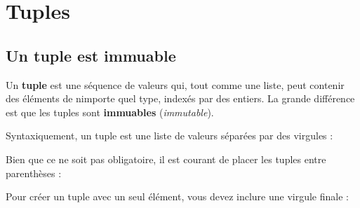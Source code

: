 \hypertarget{tuples}{%
\section{Tuples}\label{tuples}}

\hypertarget{un-tuple-est-immuable}{%
\subsection{Un tuple est immuable}\label{un-tuple-est-immuable}}

Un \textbf{tuple} est une séquence de valeurs qui, tout comme une liste,
peut contenir des éléments de n\textquotesingle importe quel type,
indexés par des entiers. La grande différence est que les tuples sont
\textbf{immuables} (\emph{immutable}).

Syntaxiquement, un tuple est une liste de valeurs séparées par des
virgules :

\begin{Shaded}
\begin{Highlighting}[]
\OperatorTok{\textgreater{}\textgreater{}\textgreater{}}\OperatorTok{=} \NormalTok{, }\NormalTok{, }\NormalTok{, }\NormalTok{, }
\end{Highlighting}
\end{Shaded}

Bien que ce ne soit pas obligatoire, il est courant de placer les tuples
entre parenthèses :

\begin{Shaded}
\begin{Highlighting}[]
\OperatorTok{\textgreater{}\textgreater{}\textgreater{}}\OperatorTok{=}\NormalTok{ (}\NormalTok{, }\NormalTok{, }\NormalTok{, }\NormalTok{, }\NormalTok{)}
\end{Highlighting}
\end{Shaded}

Pour créer un tuple avec un seul élément, vous devez inclure une virgule
finale :

\begin{Shaded}
\begin{Highlighting}[]
\OperatorTok{\textgreater{}\textgreater{}\textgreater{}}\OperatorTok{=}\NormalTok{ (}\NormalTok{,)}
\OperatorTok{\textgreater{}\textgreater{}\textgreater{}} 
\OperatorTok{\textless{}} \OperatorTok{\textgreater{}}
\end{Highlighting}
\end{Shaded}

